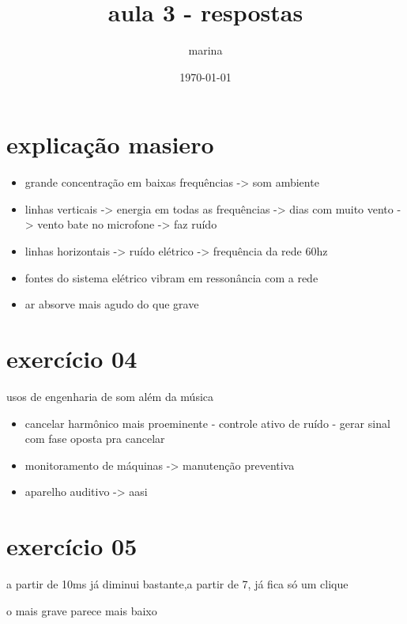\documentclass{article}
\title{aula 3 - respostas}
\author{marina}
\date{\today}
\begin{document}
\maketitle

\section{explicação masiero}
\begin{itemize}
    \item grande concentração em baixas frequências -> som ambiente
    \item linhas verticais -> energia em todas as frequências -> dias com muito vento -> vento bate no microfone -> faz ruído
    \item linhas horizontais -> ruído elétrico -> frequência da rede 60hz 
    \item fontes do sistema elétrico vibram em ressonância com a rede
    \item ar absorve mais agudo do que grave
\end{itemize}

\section{exercício 04}
usos de engenharia de som além da música
\begin{itemize}
    \item cancelar harmônico mais proeminente - controle ativo de ruído - gerar sinal com fase oposta pra cancelar
    \item monitoramento de máquinas -> manutenção preventiva
    \item aparelho auditivo -> aasi
\end{itemize}

\section{exercício 05}
\begin{itemerize}
    \item a partir de 10ms já diminui bastante,a partir de 7, já fica só um clique
    \item o mais grave parece mais baixo
    \item 
\end{itemerize}
\end{document}
